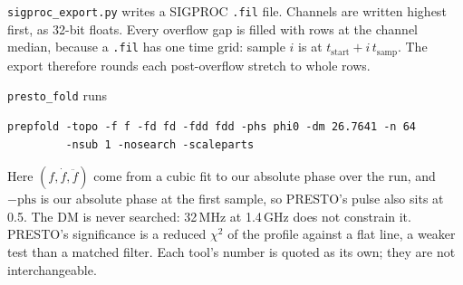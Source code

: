 \documentclass[11pt,a4paper]{article}
\newcommand{\code}[1]{\texttt{#1}}
\begin{document}
\code{sigproc\_export.py} writes a SIGPROC \code{.fil} file. Channels are written highest first, as 32-bit floats. Every overflow gap is filled with rows at the channel median, because a \code{.fil} has one time grid: sample $i$ is at $t_\mathrm{start} + i\,t_\mathrm{samp}$. The export therefore rounds each post-overflow stretch to whole rows.

\code{presto\_fold} runs
\begin{verbatim}
prepfold -topo -f f -fd fd -fdd fdd -phs phi0 -dm 26.7641 -n 64
         -nsub 1 -nosearch -scaleparts
\end{verbatim}
Here $(f, \dot f, \ddot f)$ come from a cubic fit to our absolute phase over the run, and $-\mathrm{phs}$ is our absolute phase at the first sample, so PRESTO's pulse also sits at 0.5. The DM is never searched: 32\,MHz at 1.4\,GHz does not constrain it. PRESTO's significance is a reduced $\chi^2$ of the profile against a flat line, a weaker test than a matched filter. Each tool's number is quoted as its own; they are not interchangeable.

\end{document}

